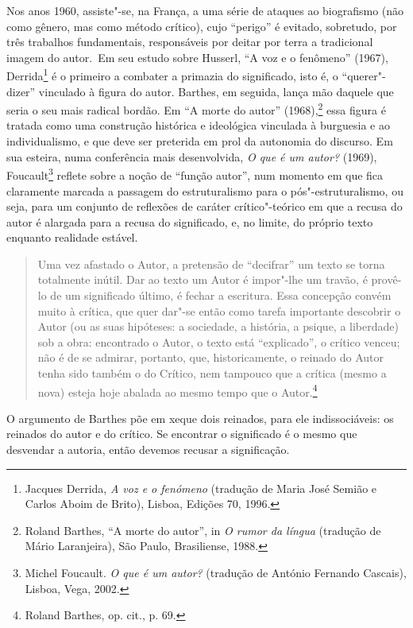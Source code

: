 Nos anos 1960, assiste"-se, na França, a uma série de ataques ao
biografismo (não como gênero, mas como método crítico), cujo ``perigo''
é evitado, sobretudo, por três trabalhos fundamentais, responsáveis por
deitar por terra a tradicional imagem do autor.~Em seu estudo sobre
Husserl, ``A voz e o fenômeno'' (1967), Derrida\footnote{Jacques
  Derrida, \emph{A voz e o fenómeno} (tradução de Maria José Semião e
  Carlos Aboim de Brito), Lisboa, Edições 70, 1996.} é o primeiro a
combater a primazia do significado, isto é, o ``querer"-dizer'' vinculado
à figura do autor. Barthes, em seguida, lança mão daquele que seria o
seu mais radical bordão. Em ``A morte do autor'' (1968),\footnote{Roland
  Barthes, ``A morte do autor'', in \emph{O rumor da língua} (tradução
  de Mário Laranjeira), São Paulo, Brasiliense, 1988.} essa figura é
tratada como uma construção histórica e ideológica vinculada à burguesia
e ao individualismo, e que deve ser preterida em prol da autonomia do
discurso. Em sua esteira, numa conferência mais desenvolvida, \emph{O
que é um autor?} (1969), Foucault\footnote{Michel Foucault. \emph{O que
  é um autor?} (tradução de António Fernando Cascais), Lisboa, Vega,
  2002.} reflete sobre a noção de ``função autor'', num momento em que
fica claramente marcada a passagem do estruturalismo para o
pós"-estruturalismo, ou seja, para um conjunto de reflexões de caráter
crítico"-teórico em que a recusa do autor é alargada para a recusa do
significado, e, no limite, do próprio texto enquanto realidade estável.

\begin{quote}
Uma vez afastado o Autor, a pretensão de ``decifrar'' um texto se torna
totalmente inútil. Dar ao texto um Autor é impor"-lhe um travão, é
provê-lo de um significado último, é fechar a escritura. Essa concepção
convém muito à crítica, que quer dar"-se então como tarefa importante
descobrir o Autor (ou as suas hipóteses: a sociedade, a história, a
psique, a liberdade) sob a obra: encontrado o Autor, o texto está
``explicado'', o crítico venceu; não é de se admirar, portanto, que,
historicamente, o reinado do Autor tenha sido também o do Crítico, nem
tampouco que a crítica (mesmo a nova) esteja hoje abalada ao mesmo tempo
que o Autor.\footnote{Roland Barthes, op. cit., p. 69.}
\end{quote}

O argumento de Barthes põe em xeque dois reinados, para ele
indissociáveis: os reinados do autor e do crítico. Se encontrar o
significado é o mesmo que desvendar a autoria, então devemos recusar a
significação.

